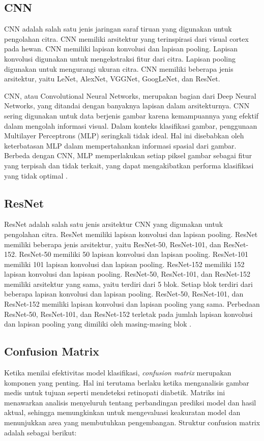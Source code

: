 \subsection{CNN}
\label{sec:223}

CNN adalah salah satu jenis jaringan saraf tiruan yang digunakan untuk pengolahan citra. CNN memiliki arsitektur yang terinspirasi dari visual cortex pada hewan. CNN memiliki lapisan konvolusi dan lapisan pooling. Lapisan konvolusi digunakan untuk mengekstraksi fitur dari citra. Lapisan pooling digunakan untuk mengurangi ukuran citra. CNN memiliki beberapa jenis arsitektur, yaitu LeNet, AlexNet, VGGNet, GoogLeNet, dan ResNet.

CNN, atau Convolutional Neural Networks, merupakan bagian dari Deep Neural Networks, yang ditandai dengan banyaknya lapisan dalam arsitekturnya. CNN sering digunakan untuk data berjenis gambar karena kemampuannya yang efektif dalam mengolah informasi visual. Dalam konteks klasifikasi gambar, penggunaan Multilayer Perceptrons (MLP) seringkali tidak ideal. Hal ini disebabkan oleh keterbatasan MLP dalam mempertahankan informasi spasial dari gambar. Berbeda dengan CNN, MLP memperlakukan setiap piksel gambar sebagai fitur yang terpisah dan tidak terkait, yang dapat mengakibatkan performa klasifikasi yang tidak optimal \parencite{AstutiSamsuryadi2018}.

\subsection{ResNet}
\label{sec:224}

ResNet adalah salah satu jenis arsitektur CNN yang digunakan untuk pengolahan citra. ResNet memiliki lapisan konvolusi dan lapisan pooling. ResNet memiliki beberapa jenis arsitektur, yaitu ResNet-50, ResNet-101, dan ResNet-152. ResNet-50 memiliki 50 lapisan konvolusi dan lapisan pooling. ResNet-101 memiliki 101 lapisan konvolusi dan lapisan pooling. ResNet-152 memiliki 152 lapisan konvolusi dan lapisan pooling. ResNet-50, ResNet-101, dan ResNet-152 memiliki arsitektur yang sama, yaitu terdiri dari 5 blok. Setiap blok terdiri dari beberapa lapisan konvolusi dan lapisan pooling. ResNet-50, ResNet-101, dan ResNet-152 memiliki lapisan konvolusi dan lapisan pooling yang sama. Perbedaan ResNet-50, ResNet-101, dan ResNet-152 terletak pada jumlah lapisan konvolusi dan lapisan pooling yang dimiliki oleh masing-masing blok \parencite{He2016}.

\subsection{Confusion Matrix}
Ketika menilai efektivitas model klasifikasi, \emph{confusion matrix} merupakan komponen yang penting. Hal ini terutama berlaku ketika menganalisis gambar medis untuk tujuan seperti mendeteksi retinopati diabetik. Matriks ini menawarkan analisis menyeluruh tentang perbandingan prediksi model dan hasil aktual, sehingga memungkinkan untuk mengevaluasi keakuratan model dan menunjukkan area yang membutuhkan pengembangan.
Struktur confusion matrix adalah sebagai berikut:


